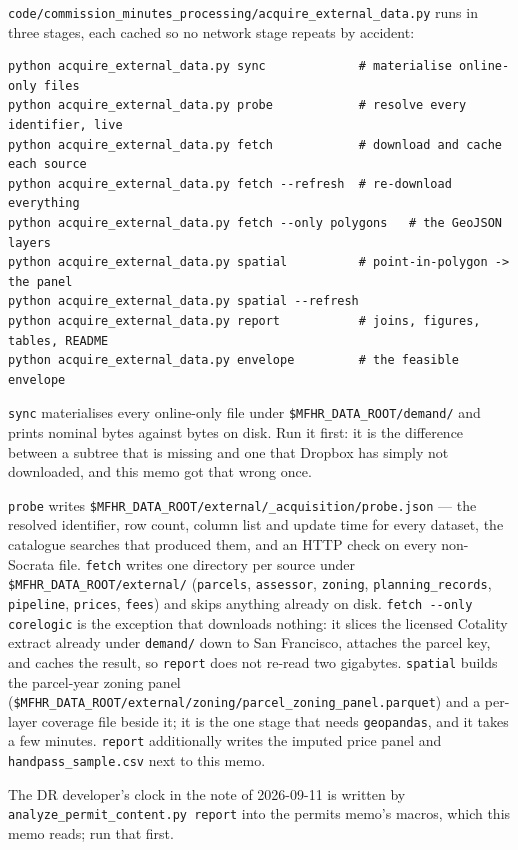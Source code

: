 \documentclass[11pt]{article}
\begin{document}
\texttt{code/commission\_minutes\_processing/acquire\_external\_data.py} runs in three stages,
each cached so no network stage repeats by accident:

\begin{verbatim}
python acquire_external_data.py sync             # materialise online-only files
python acquire_external_data.py probe            # resolve every identifier, live
python acquire_external_data.py fetch            # download and cache each source
python acquire_external_data.py fetch --refresh  # re-download everything
python acquire_external_data.py fetch --only polygons   # the GeoJSON layers
python acquire_external_data.py spatial          # point-in-polygon -> the panel
python acquire_external_data.py spatial --refresh
python acquire_external_data.py report           # joins, figures, tables, README
python acquire_external_data.py envelope         # the feasible envelope
\end{verbatim}

\texttt{sync} materialises every online-only file under
\texttt{\$MFHR\_DATA\_ROOT/demand/} and prints nominal bytes against bytes on disk.
Run it first: it is the difference between a subtree that is missing and one that Dropbox has
simply not downloaded, and this memo got that wrong once.

\texttt{probe} writes \texttt{\$MFHR\_DATA\_ROOT/external/\_acquisition/probe.json} --- the
resolved identifier, row count, column list and update time for every dataset, the catalogue
searches that produced them, and an HTTP check on every non-Socrata file. \texttt{fetch}
writes one directory per source under \texttt{\$MFHR\_DATA\_ROOT/external/}
(\texttt{parcels}, \texttt{assessor}, \texttt{zoning}, \texttt{planning\_records},
\texttt{pipeline}, \texttt{prices}, \texttt{fees}) and skips anything already on disk.
\texttt{fetch -{}-only corelogic} is the exception that downloads nothing: it slices the
licensed Cotality extract already under \texttt{demand/} down to San Francisco, attaches the
parcel key, and caches the result, so \texttt{report} does not re-read two gigabytes.
\texttt{spatial} builds the parcel-year zoning panel
(\texttt{\$MFHR\_DATA\_ROOT/}\allowbreak\texttt{external/zoning/parcel\_zoning\_panel.parquet})
and a per-layer coverage file beside it; it is the one stage that needs
\texttt{geopandas}, and it takes a few minutes. \texttt{report} additionally writes the
imputed price panel and \texttt{handpass\_sample.csv} next to this memo.

The DR developer's clock in the note of 2026-09-11 is written by
\texttt{analyze\_permit\_content.py report} into the permits memo's macros, which this memo
reads; run that first.
\end{document}
